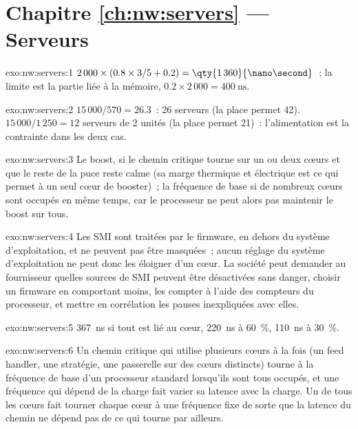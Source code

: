 \section*{Chapitre \ref{ch:nw:servers} --- Serveurs}

\begin{solution}{exo:nw:servers:1}
$2\,000 \times (0.8 \times 3/5 + 0.2) = \qty{1\,360}{\nano\second}$~; la limite est la partie liée à la mémoire, $0.2 \times 2\,000 =
\qty{400}{\nano\second}$.
\end{solution}

\begin{solution}{exo:nw:servers:2}
$15\,000/570 = 26.3$~: 26 serveurs (la place permet 42). $15\,000/1\,250 = 12$ serveurs de 2 unités (la place permet 21)~: l'alimentation est la contrainte dans les deux cas.
\end{solution}

\begin{solution}{exo:nw:servers:3}
Le boost, si le chemin critique tourne sur un ou deux cœurs et que le reste de la puce reste calme (sa marge thermique et électrique est ce qui permet à un
seul cœur de booster)~; la fréquence de base si de nombreux cœurs sont occupés en même temps, car le processeur ne peut alors pas maintenir le boost sur tous.
\end{solution}

\begin{solution}{exo:nw:servers:4}
Les SMI sont traitées par le firmware, en dehors du système d'exploitation, et ne peuvent pas être masquées~; aucun réglage du système d'exploitation ne peut donc les éloigner d'un cœur. La société
peut demander au fournisseur quelles sources de SMI peuvent être désactivées sans danger, choisir un firmware en comportant moins, les compter à l'aide des compteurs du processeur, et
mettre en corrélation les pauses inexpliquées avec elles.
\end{solution}

\begin{solution}{exo:nw:servers:5}
\qty{367}{\nano\second} si tout est lié au cœur, \qty{220}{\nano\second} à 60~\%, \qty{110}{\nano\second} à 30~\%.
\end{solution}

\begin{solution}{exo:nw:servers:6}
Un chemin critique qui utilise plusieurs cœurs à la fois (un feed handler, une stratégie, une passerelle sur des cœurs distincts) tourne à la fréquence de base d'un processeur standard
lorsqu'ils sont tous occupés, et une fréquence qui dépend de la charge fait varier sa latence avec la charge. Un  de tous les cœurs fait tourner chaque cœur à une fréquence fixe
de sorte que la latence du chemin ne dépend pas de ce qui tourne par ailleurs.
\end{solution}

